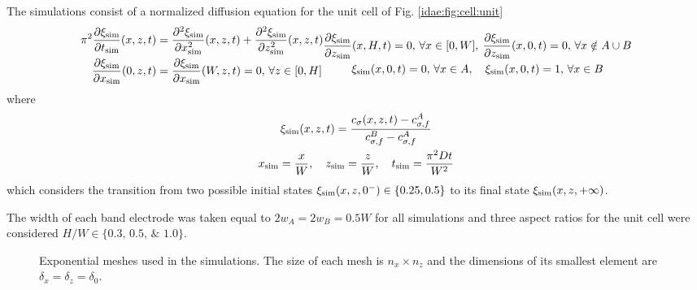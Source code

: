 The simulations consist of a normalized diffusion equation for the unit cell of Fig. \ref{idae:fig:cell:unit}
\begin{subequations}
	\label{idae:eqn:pde:idae:normalized}
	\begin{align}
		\pi^{2} \parderiv{\xi\simu}{t\simu}(x, z, t) 
		&= \parderiv{^2 \xi\simu}{x\simu^{2}}(x, z, t)
		+ \parderiv{^{2} \xi\simu}{z\simu^{2}}(x, z, t) \\
		\parderiv{\xi\simu}{x\simu}(0,z,t)
		&= \parderiv{\xi\simu}{x\simu}(W, z, t) = 0,
		\, \forall z \in [0,H]
	\end{align}
	\vspace{-1.5\baselineskip}
	\begin{gather}
		\parderiv{\xi\simu}{z\simu}(x, H, t) = 0,\, \forall x \in [0,W],
		\: \parderiv{\xi\simu}{z\simu}(x,0,t) = 0,
		\, \forall x \notin A \cup B
		\\
		\xi\simu(x,0,t) = 0,\, \forall x \in A,
		\quad \xi\simu(x,0,t) = 1,\, \forall x \in B
		\label{idae:eqn:pde:idae:normalized:onAB}
	\end{gather}
\end{subequations}
where
\begin{subequations}
	\label{idae:eqn:pde:normalization}
	\begin{gather}
		\xi_{\mathrm{sim}}(x,z,t) = \frac{c_{\sigma}(x,z,t) - c_{\sigma,f}^{A}}{c_{\sigma,f}^{B} - c_{\sigma,f}^{A}}
		\\
		x_{\mathrm{sim}} = \frac{x}{W}
		,\quad z_{\mathrm{sim}} = \frac{z}{W}
		,\quad t_{\mathrm{sim}} = \frac{\pi^{2} D t}{W^{2}}
	\end{gather}
\end{subequations}
which considers the transition  %
from two possible initial states $\xi\simu(x,z,0^{-}) \in \{\numlist[list-pair-separator={,}]{0,25; 0,5}\}$ to its final state $\xi_{\mathrm{sim}}(x,z,+\infty)$.

The width of each band electrode was taken equal to $2w_{A} = 2w_{B} = \num{0,5} W$ for all simulations
and three aspect ratios for the unit cell were considered
$H/W \in \{\numlist[list-final-separator={,}]{0,3; 0,5; 1,0}\}$.

\begin{figure}[t]
	\centering
	\hspace{1em}
	\caption{
		Exponential meshes used in the simulations.
		The size of each mesh is $n_{x} \times n_{z}$
		and the dimensions of its smallest element are $\delta_{x} = \delta_{z} = \delta_{0}$.
	}
	\label{idae:fig:mesh}
\end{figure}

